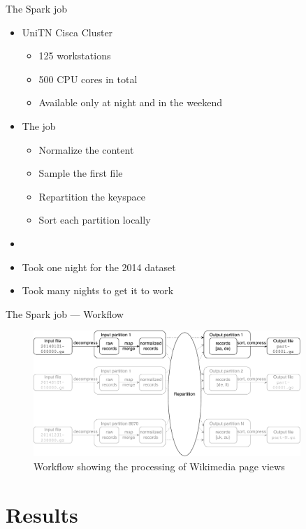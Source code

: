 \documentclass{beamer}
\begin{document}
\begin{frame}{The Spark job}
    \begin{itemize}
        \item UniTN Cisca Cluster
        \begin{itemize}
            \item 125 workstations
            \item 500 CPU cores in total
            \item Available only at night and in the weekend
        \end{itemize}
        \item The job
        \begin{itemize}
            \item Normalize the content
            \item Sample the first file
            \item Repartition the keyspace
            \item Sort each partition locally
        \end{itemize}
        \item[]
        \item Took one night for the 2014 dataset
        \item Took many nights to get it to work
    \end{itemize}
\end{frame}

\begin{frame}[c]{The Spark job --- Workflow}
    \begin{figure}
    \centering
    \includegraphics[width=0.9\textwidth]{assets/spark-pagecounts}
    \caption{Workflow showing the processing of Wikimedia page views}
    \end{figure}
\end{frame}


\section{Results}
\end{document}
